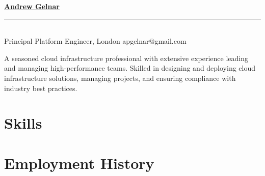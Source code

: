 \documentclass[10pt]{article} %
\begin{document}

{\huge{\textbf{\href{https://github.com/neoshrew/CV/blob/master/andrew_gelnar_cv.pdf}{Andrew Gelnar}}}}
\\
\rule{\textwidth}{0.5mm}
\\
Principal Platform Engineer, London
\hfill
apgelnar@gmail.com


A seasoned cloud infrastructure professional with extensive experience leading and managing
high-performance teams.
Skilled in designing and deploying cloud infrastructure solutions, managing projects, and
ensuring compliance with industry best practices.


\vspace{-5mm}
\section{Skills}


\section{Employment History}
\end{document}
